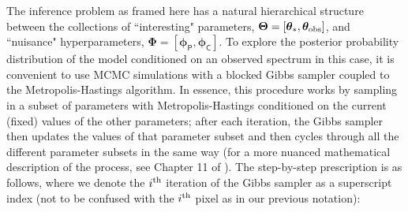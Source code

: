 \documentclass[iop,floatfix]{emulateapj}
\newcommand{\vt}{ {\bm \theta}}
\newcommand{\vT}{ {\bm \Theta}}
\newcommand{\vp}{ {\bm \phi}}
\newcommand{\vP}{ {\bm \Phi}}
\newcommand{\cheb}{ \vp_{\mathsf{P}}}
\newcommand{\cov}{ \vp_{\mathsf{C}}}
\begin{document}
The inference problem as framed here has a natural hierarchical structure between the collections 
of ``interesting" parameters, $\vT = [\vt_{\ast}, \vt_{\rm obs}]$, and ``nuisance" hyperparameters, 
$\vP = [\cheb, \cov]$.  To explore the posterior probability distribution of the model conditioned 
on an observed spectrum in this case, it is convenient to use MCMC simulations with a blocked Gibbs 
sampler coupled to the Metropolis-Hastings algorithm.  In essence, this procedure works by sampling 
in a subset of parameters with Metropolis-Hastings conditioned on the current (fixed) values of the 
other parameters; after each iteration, the Gibbs sampler then updates the values of that parameter 
subset and then cycles through all the different parameter subsets in the same way (for a more 
nuanced mathematical description of the process, see Chapter 11 of \citealt{gelman13}).  The 
step-by-step prescription is as follows, where we denote the $i^{\rm th}$ iteration of the Gibbs 
sampler as a superscript index (not to be confused with the $i^{\rm th}$ pixel as in our previous 
notation):
\end{document}
